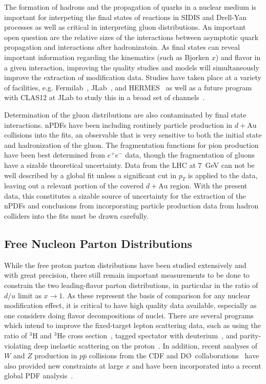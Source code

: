 The formation of hadrons and the propagation of quarks in a nuclear medium is important for interpeting the final states of reactions in SIDIS and Drell-Yan processes as well as critical in interpreting gluon distributions.  An important open question are the relative sizes of the interactions between asymptotic quark propagation and interactions after hadronizatoin.  As final states can reveal important information regarding the kinematics (such as Bjorken $x$) and flavor in a given interaction, improving the quality studies and models will simultaneously improve the extraction of modification data.  Studies have taken place at a variety of facilities, e.g. Fermilab~\cite{PhysRevC.75.035206}, JLab~\cite{PhysRevLett.99.242502, ELFASSI2012326}, and HERMES~\cite{Airapetian2011} as well as a future program with CLAS12 at JLab to study this in a broad set of channels~\cite{quarkformprop}.

Determination of the gluon distributions are also contaminated by final state interactions. nPDFs have been including routinely particle production in $d+\mathrm{Au}$ collisions into the fits, an observable that is very sensitive to both the initial state and hadronization of the gluon. The fragmentation functions for pion production have been best determined from $e^+e^-$ data, though the fragmentation of gluons have a sizable theoretical uncertainty. Data from the LHC at $7$~GeV can not be well described by a global fit unless a significant cut in $p_{T}$ is applied to the data, leaving out a relevant portion of the covered $d+\mathrm{Au}$ region.  With the present data, this constitutes a sizable source of uncertainty for the extraction of the nPDFs and conclusions from incorporating particle production data from hadron colliders into the fits must be drawn carefully.

\subsection{Free Nucleon Parton Distributions}

While the free proton parton distributions have been studied extensively and with great precision, there still remain important measurements to be done to constrain the two leading-flavor parton distributions, in particular in the ratio of $d/u$ limit as $x \rightarrow 1$.  As these represent the basis of comparison for any nuclear modification effect, it is critical to have high quality data available, especially as one considers doing flavor decompositions of nuclei.  There are several programs which intend to improve the fixed-target lepton scattering data, such as using the ratio of ${}^{3}$H and ${}^{3}$He cross section~\cite{mar}, tagged spectator with deuterium~\cite{bonus12}, and parity-violating deep inelastic scattering on the proton~\cite{solid_pvdis}.  In addition, recent analyses of $W$ and $Z$ production in $p\bar{p}$ collisions from the CDF and D\O\ collaborations~\cite{D0:2014kma,Abazov:2013dsa,Acosta:2005ud,Aaltonen:2009ta,Aaltonen:2010zza,Abazov:2007jy} have also provided new constraints at large $x$ and have been incorporated into a recent global PDF analysis~\cite{Accardi:2016qay}.

